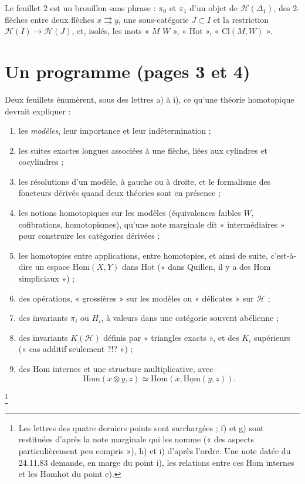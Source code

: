 \documentclass[11pt,a4paper]{article}
\begin{document}
Le feuillet 2 est un brouillon sans phrase : $\pi_0$ et $\pi_1$ d'un objet de
$\mathcal H(\Delta_1)$, des 2-flèches entre deux flèches $x
\rightrightarrows y$, une sous-catégorie $J \subset I$ et la restriction
$\mathcal H(I) \to \mathcal H(J)$, et, isolés, les mots « $M$ $W$ »,
« $\mathrm{Hot}$ », « $\mathrm{Cl}(M, W)$ ».

\section*{Un programme (pages 3 et 4)}

Deux feuillets énumèrent, sous des lettres a) à i), ce qu'une théorie
homotopique devrait expliquer :
\begin{enumerate}
  \item[a)] les \emph{modèles}, leur importance et leur indétermination ;
  \item[b)] les suites exactes longues associées à une flèche, liées aux
  cylindres et cocylindres ;
  \item[c)] les résolutions d'un modèle, à gauche ou à droite, et le
  formalisme des foncteurs dérivés quand deux théories sont en présence ;
  \item[d)] les notions homotopiques sur les modèles (équivalences
  faibles $W$, cofibrations, homotopismes), qu'une note marginale dit
  « intermédiaires » pour construire les catégories dérivées ;
  \item[e)] les homotopies entre applications, entre homotopies, et ainsi de
  suite, c'est-à-dire un espace $\mathrm{Hom}(X, Y)$ dans $\mathrm{Hot}$
  (« dans Quillen, il y a des $\mathrm{Hom}$ simpliciaux ») ;
  \item[f)] des opérations, « grossières » sur les modèles ou « délicates »
  sur $\mathcal H$ ;
  \item[g)] des invariants $\pi_i$ ou $H_i$, à valeurs dans une catégorie
  souvent abélienne ;
  \item[h)] des invariants $K(\mathcal H)$ définis par « triangles
  exacts », et des $K_i$ supérieurs (« cas additif seulement ?!? ») ;
  \item[i)] des $\mathrm{Hom}$ internes et une structure multiplicative, avec
  \[
    \mathrm{Hom}(x \otimes y, z) \simeq \mathrm{Hom}(x,
    \underline{\mathrm{Hom}}(y, z)).
  \]
\end{enumerate}
\footnote{Les lettres des quatre derniers points sont surchargées ; f) et g)
sont restituées d'après la note marginale qui les nomme (« des aspects
particulièrement peu compris »), h) et i) d'après l'ordre. Une note datée du
24.11.83 demande, en marge du point i), les relations entre ces
$\mathrm{Hom}$ internes et les $\mathrm{Homhot}$ du point e).}
\end{document}
